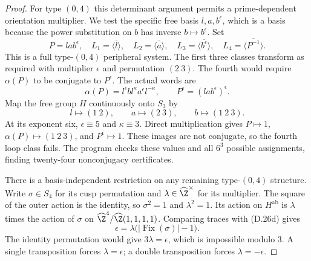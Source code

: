 \begin{proof}
For type $(0,4)$ this determinant argument permits a
prime-dependent orientation multiplier. We test the
specific free basis $l,a,b^\epsilon$, which is a basis
because the power substitution on $b$ has inverse
$b\mapsto b^\epsilon$. Set
\[
 P=lab^\epsilon,
 \quad L_1=\overline{\langle l\rangle},\quad
 L_2=\overline{\langle a\rangle},\quad
 L_3=\overline{\langle b^\epsilon\rangle},\quad
 L_4=\overline{\langle P^{-1}\rangle}.
\]
This is a full type-$(0,4)$ peripheral system. The first
three classes transform as required with multiplier
$\epsilon$ and permutation $(2\ 3)$. The fourth would
require $\alpha(P)$ to be conjugate to $P^\epsilon$.
The actual words are
\[
 \alpha(P)=l^\epsilon b l^\kappa a^\epsilon l^{-\kappa},
 \qquad P^\epsilon=(lab^\epsilon)^\epsilon.
\]
Map the free group $H$ continuously onto $S_3$ by
\[
 l\longmapsto(1\ 2),\qquad
 a\longmapsto(2\ 3),\qquad
 b\longmapsto(1\ 2\ 3).
\]
At its exponent six, $\epsilon\equiv5$ and
$\kappa\equiv3$. Direct multiplication gives
$P\mapsto1$, $\alpha(P)\mapsto(1\ 2\ 3)$,
and $P^\epsilon\mapsto1$. These images are not conjugate,
so the fourth loop class fails. The program checks these
values and all $6^3$ possible assignments, finding
twenty-four nonconjugacy certificates.

There is a basis-independent restriction on any remaining
type-$(0,4)$ structure. Write $\sigma\in S_4$ for its cusp
permutation and $\lambda\in\widehat\Z^\times$ for its
multiplier. The square of the outer action is the identity,
so $\sigma^2=1$ and $\lambda^2=1$. Its action on
$H^{\mathrm{ab}}$ is $\lambda$ times the action of
$\sigma$ on $\widehat\Z^4/\widehat\Z(1,1,1,1)$.
Comparing traces with (D.26d) gives
\[
 \epsilon=\lambda\bigl(|\operatorname{Fix}(\sigma)|-1\bigr).
                                                               \tag{D.26e}
\]
The identity permutation would give $3\lambda=\epsilon$,
which is impossible modulo $3$. A single transposition
forces $\lambda=\epsilon$; a double transposition forces
$\lambda=-\epsilon$.


\end{proof}
